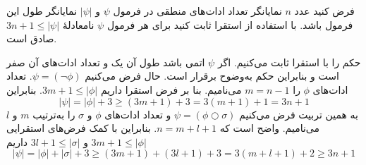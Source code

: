 فرض کنید عدد $n$ نمایانگر تعداد ادات‌های منطقی در فرمول $\psi$ و $|\psi|$ نمایانگر طول این فرمول باشد. با استفاده از استقرا ثابت کنید برای هر فرمول $\psi$ نامعادلهٔ
$3n+1\leq|\psi|$ صادق است.
\begin{ans}
حکم را با استقرا ثابت می‌کنیم. اگر $\psi$ اتمی باشد طول آن یک و تعداد ادات‌های آن صفر است و بنابراین حکم به‌وضوح برقرار است. حال فرض می‌کنیم
$\psi=(\neg\phi)$.
تعداد ادات‌های $\phi$ را $m=n-1$ می‌نامیم. بنا بر فرض استقرا داریم
$3m+1\leq|\phi|$.
بنابراین
$$
|\psi|=|\phi|+3\geq(3m+1)+3=3(m+1)+1=3n+1
$$
به همین تربیت فرض می‌کنیم
$\psi=(\phi\Circle\sigma)$
و تعداد ادات‌های $\phi$ و $\sigma$ را به‌ترتیب $m$ و $l$ می‌نامیم. واضح است که $n=m+l+1$. بنابراین با کمک فرض‌های استقرایی
$3m+1\leq|\phi|$
و
$3l+1\leq|\sigma|$
داریم
$$|\psi|=|\phi|+|\sigma|+3\geq(3m+1)+(3l+1)+3=3(m+l+1)+2\geq3n+1$$
\end{ans}
